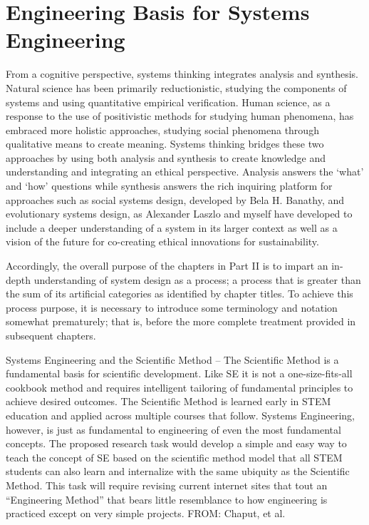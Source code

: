 \section{Engineering Basis for Systems Engineering}

From a cognitive perspective, systems thinking integrates analysis and synthesis. Natural science has been primarily reductionistic, studying the components of systems and using quantitative empirical verification. Human science, as a response to the use of positivistic methods for studying human phenomena, has embraced more holistic approaches, studying social phenomena through qualitative means to create meaning. Systems thinking bridges these two approaches by using both analysis and synthesis to create knowledge and understanding and integrating an ethical perspective. Analysis answers the `what’ and `how’ questions while synthesis answers the rich inquiring platform for approaches such as social systems design, developed by Bela H. Banathy, and evolutionary systems design, as Alexander Laszlo and myself have developed to include a deeper understanding of a system in its larger context as well as a vision of the future for co-creating ethical innovations for sustainability.

Accordingly, the overall purpose of the chapters in Part II is to impart an in-depth understanding of system design as a process; a process that is greater than the sum of its artificial categories as identified by chapter titles. To achieve this process purpose, it is necessary to introduce some terminology and notation somewhat prematurely; that is, before the more complete treatment provided in subsequent chapters.

Systems Engineering and the Scientific Method – The Scientific Method is a fundamental basis for scientific development. Like SE it is not a one-size-fits-all cookbook method and requires intelligent tailoring of fundamental principles to achieve desired outcomes. The Scientific Method is learned early in STEM education and applied across multiple courses that follow. Systems Engineering, however, is just as fundamental to engineering of even the most fundamental concepts. The proposed research task would develop a simple and easy way to teach the concept of SE based on the scientific method model that all STEM students can also learn and internalize with the same ubiquity as the Scientific Method. This task will require revising current internet sites that tout an ``Engineering Method'' that bears little resemblance to how engineering is practiced except on very simple projects. FROM: Chaput, et al.

